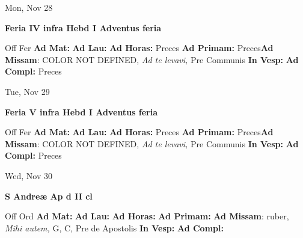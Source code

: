 \documentclass[10pt]{memoir}
\begin{document}
\begin{center}
\begin{minipage}{3.5in}
\vspace{2em}
\begin{center}Mon, Nov 28
\end{center}
\textbf{ \large Feria IV infra Hebd I Adventus
\textnormal{\normalsize feria}}

\begin{justify}Off Fer
\textbf{Ad Mat: }
\textbf{Ad Lau: }
\textbf{Ad Horas: }Preces
\textbf{Ad Primam: }Preces\textbf{Ad Missam}: COLOR NOT DEFINED, \textit{Ad te levavi,} Pre Communis
\textbf{In Vesp: }
\textbf{Ad Compl: }Preces
\end{justify}
\end{minipage}
\end{center}

\begin{center}
\begin{minipage}{3.5in}
\vspace{2em}
\begin{center}Tue, Nov 29
\end{center}
\textbf{ \large Feria V infra Hebd I Adventus
\textnormal{\normalsize feria}}

\begin{justify}Off Fer
\textbf{Ad Mat: }
\textbf{Ad Lau: }
\textbf{Ad Horas: }Preces
\textbf{Ad Primam: }Preces\textbf{Ad Missam}: COLOR NOT DEFINED, \textit{Ad te levavi,} Pre Communis
\textbf{In Vesp: }
\textbf{Ad Compl: }Preces
\end{justify}
\end{minipage}
\end{center}

\begin{center}
\begin{minipage}{3.5in}
\vspace{2em}
\begin{center}Wed, Nov 30
\end{center}
\textbf{ \large S Andreæ Ap
\textnormal{\normalsize d II cl}}

\begin{justify}Off Ord
\textbf{Ad Mat: }
\textbf{Ad Lau: }
\textbf{Ad Horas: }
\textbf{Ad Primam: }\textbf{Ad Missam}: ruber, \textit{Mihi autem,} G, C, Pre de Apostolis
\textbf{In Vesp: }
\textbf{Ad Compl: }
\end{justify}
\end{minipage}
\end{center}
\end{document}
